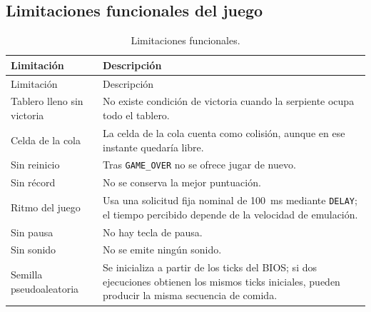 \documentclass[10pt]{article}
\begin{document}
\subsection{Limitaciones funcionales del juego}
\begin{longtable}{@{}p{4.2cm}p{9.2cm}@{}}
\caption{Limitaciones funcionales.}\label{tab:limfun}\\
\toprule
Limitación & Descripción \\
\midrule
\endfirsthead
\toprule
Limitación & Descripción \\
\midrule
\endhead
\bottomrule
\endfoot
Tablero lleno sin victoria & No existe condición de victoria cuando la serpiente ocupa todo el tablero. \\
Celda de la cola & La celda de la cola cuenta como colisión, aunque en ese instante quedaría libre. \\
Sin reinicio & Tras \texttt{GAME\_OVER} no se ofrece jugar de nuevo. \\
Sin récord & No se conserva la mejor puntuación. \\
Ritmo del juego & Usa una solicitud fija nominal de 100~ms mediante \texttt{DELAY}; el tiempo percibido depende de la velocidad de emulación. \\
Sin pausa & No hay tecla de pausa. \\
Sin sonido & No se emite ningún sonido. \\
Semilla pseudoaleatoria & Se inicializa a partir de los ticks del BIOS; si dos ejecuciones obtienen los mismos ticks iniciales, pueden producir la misma secuencia de comida. \\
\end{longtable}
\end{document}
